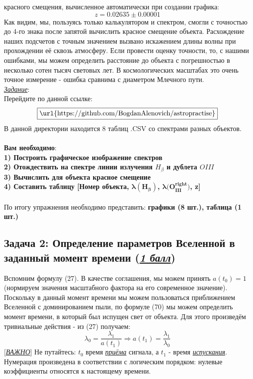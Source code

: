 \documentclass{article}
\newcommand{\subs}[1]{\addcontentsline{toc}{subsection}{ \small #1}\fancyhead[L]{#1}}
\newcommand{\ttt}[1]{\underline{\textit{#1}}}
\newcommand{\ff}[1]{\mathbf{#1}}
\newcommand{\eq}[1]{\begin{equation} #1 \end{equation}}
\begin{document}
красного смещения, вычисленное автоматически при создании графика:
$$z = 0.02635 \pm 0.00001 $$
Как видим, мы, пользуясь только калькулятором и спектром, смогли с точностью до 4-го знака после запятой
вычислить красное смещение объекта. Расхождение наших подсчетов с точным значением вызвано
искажением длины волны при прохождении её сквозь атмосферу. Если провести оценку точности,
то, с нашими ошибками, мы можем определить расстояние до объекта с погрешностью в 
несколько сотен тысяч световых лет. В космологических масштабах это очень точное 
измерение - ошибка сравнима с диаметром Млечного пути. \\
\ttt{Задание}:\\
Перейдите по данной ссылке: $$\boxed{\text{\url{https://github.com/BogdanAlenovich/astropractise}}}$$
В данной директории находится 8 таблиц .CSV со спектрами разных объектов.\\\\ \textbf{Вам необходимо}:\\
\textbf{1) Построить графическое изображение спектров}\\
\textbf{2) Отождествить на спектре линии излучения $H_\beta$ и дублета $OIII$}\\
\textbf{3) Вычислить для объекта красное смещение} \\
\textbf{4) Составить таблицу [Номер объекта, $\ff{\lambda(H_\beta)}$, $\ff{\lambda(O_{III}^{right}})$, z]}
\\\\По итогу упражнения необходимо представить: \textbf{графики (8 шт.), таблица (1 шт.)}
\newpage
\subs{Задача 2}
\subsection*{Задача 2: Определение параметров Вселенной в заданный момент времени (\ttt{1 балл})}
Вспомним формулу (27). В качестве соглашения, мы можем принять $a(t_0) = 1$ (нормируем
значения масштабного фактора на его современное значение). \\
Поскольку в данный момент времени мы можем пользоваться приближением Вселенной с
доминированием пыли, по формуле (70) мы можем определить момент времени, в который
был испущен свет от объекта. Для этого произведём тривиальные действия - из (27) получаем:
\eq{\lambda_0 = \frac{\lambda_1}{a(t_1)} \Rightarrow a(t_1)=\frac{\lambda_1}{\lambda_0}}
[\ttt{ВАЖНО}] Не путайтесь: $t_0$ время \ttt{приёма} сигнала, а $t_1$ - время 
\ttt{испускания}. Нумерация произведена в соответствии с логическим порядком: нулевые 
коэффициенты относятся к настоящему времени.  
\end{document}
